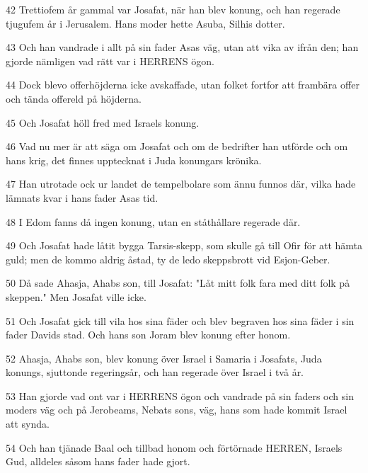 \par 42 Trettiofem år gammal var Josafat, när han blev konung, och han regerade tjugufem år i Jerusalem. Hans moder hette Asuba, Silhis dotter.
\par 43 Och han vandrade i allt på sin fader Asas väg, utan att vika av ifrån den; han gjorde nämligen vad rätt var i HERRENS ögon.
\par 44 Dock blevo offerhöjderna icke avskaffade, utan folket fortfor att frambära offer och tända offereld på höjderna.
\par 45 Och Josafat höll fred med Israels konung.
\par 46 Vad nu mer är att säga om Josafat och om de bedrifter han utförde och om hans krig, det finnes upptecknat i Juda konungars krönika.
\par 47 Han utrotade ock ur landet de tempelbolare som ännu funnos där, vilka hade lämnats kvar i hans fader Asas tid.
\par 48 I Edom fanns då ingen konung, utan en ståthållare regerade där.
\par 49 Och Josafat hade låtit bygga Tarsis-skepp, som skulle gå till Ofir för att hämta guld; men de kommo aldrig åstad, ty de ledo skeppsbrott vid Esjon-Geber.
\par 50 Då sade Ahasja, Ahabs son, till Josafat: "Låt mitt folk fara med ditt folk på skeppen." Men Josafat ville icke.
\par 51 Och Josafat gick till vila hos sina fäder och blev begraven hos sina fäder i sin fader Davids stad. Och hans son Joram blev konung efter honom.
\par 52 Ahasja, Ahabs son, blev konung över Israel i Samaria i Josafats, Juda konungs, sjuttonde regeringsår, och han regerade över Israel i två år.
\par 53 Han gjorde vad ont var i HERRENS ögon och vandrade på sin faders och sin moders väg och på Jerobeams, Nebats sons, väg, hans som hade kommit Israel att synda.
\par 54 Och han tjänade Baal och tillbad honom och förtörnade HERREN, Israels Gud, alldeles såsom hans fader hade gjort.


